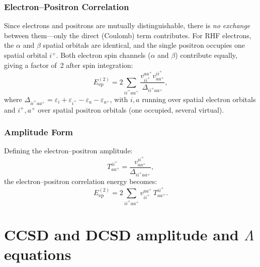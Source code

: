 \documentclass[a4paper,12pt,oneside]{book}
\newcommand{\pos}[1]{{#1}^{+}}
\begin{document}
\subsection{Electron--Positron Correlation}
Since electrons and positrons are mutually distinguishable, there is
\emph{no exchange} between them---only the direct (Coulomb) term contributes.
For RHF electrons, the $\alpha$ and $\beta$ spatial orbitals are identical,
and the single positron occupies one spatial orbital $\pos{i}$.
Both electron spin channels ($\alpha$ and $\beta$) contribute equally,
giving a factor of~2 after spin integration:
\begin{equation}
E^{(2)}_{\mathrm{ep}} = 2 \sum_{i\pos{i}a\pos{a}}
\frac{v_{i\pos{i}}^{a\pos{a}}v_{a\pos{a}}^{i\pos{i}}}{\Delta_{i\pos{i}a\pos{a}}},
\end{equation}
where $\Delta_{i\pos{i}a\pos{a}} = \varepsilon_i + \varepsilon_{\pos{i}} - \varepsilon_a - \varepsilon_{\pos{a}}$,
with $i,a$ running over spatial electron orbitals and $\pos{i},\pos{a}$ over spatial
positron orbitals (one occupied, several virtual).

\subsection{Amplitude Form}
Defining the electron--positron amplitude:
\begin{equation}
T^{i\pos{i}}_{a\pos{a}} = \frac{v_{a\pos{a}}^{i\pos{i}}}{\Delta_{i\pos{i}a\pos{a}}},
\end{equation}
the electron--positron correlation energy becomes:
\begin{equation}
\label{eq:ep-mp2}
\boxed{E^{(2)}_{\mathrm{ep}} = 2 \sum_{i\pos{i}a\pos{a}} v_{i\pos{i}}^{a\pos{a}} \, T^{i\pos{i}}_{a\pos{a}}.}
\end{equation}



\chapter{CCSD and DCSD amplitude and $\Lambda$ equations}
\end{document}
